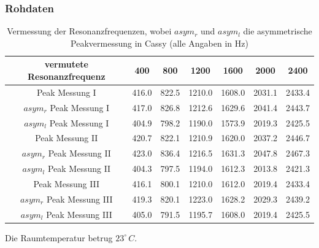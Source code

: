 \documentclass[12pt,a4paper]{article}
\begin{document}
\subsubsection{Rohdaten}
\begin{table}[H]
\begin{tabular}{c|c|c|c|c|c|c}
vermutete Resonanzfrequenz & 400 & 800 & 1200 & 1600 & 2000 & 2400 \\ 
\hline 
Peak Messung I & 416.0 & 822.5 & 1210.0 & 1608.0 & 2031.1 & 2433.4 \\  
$asym_r$ Peak Messung I & 417.0 & 826.8 & 1212.6 & 1629.6 & 2041.4 & 2443.7 \\  
$asym_l$ Peak Messung I & 404.9 & 798.2 & 1190.0 & 1573.9 & 2019.3 & 2425.5 \\ 
\hline 
Peak Messung II & 420.7 & 822.1 & 1210.9 & 1620.0 & 2037.2 & 2446.7 \\  
$asym_r$ Peak Messung II & 423.0 & 836.4 & 1216.5 & 1631.3 & 2047.8 & 2467.3 \\ 
$asym_l$ Peak Messung II & 404.3 & 797.5 & 1194.0 & 1612.3 & 2013.8 & 2421.3 \\ 
\hline 
Peak Messung III & 416.1 & 800.1 & 1210.0 & 1612.0 & 2019.4 & 2433.4 \\  
$asym_r$ Peak Messung III & 419.3 & 820.1 & 1223.0 & 1628.2 & 2029.3 & 2439.2 \\  
$asym_l$ Peak Messung III & 405.0 & 791.5 & 1195.7 & 1608.0 & 2019.4 & 2425.5
\end{tabular}
\caption{Vermessung der Resonanzfrequenzen, wobei $asym_r$ und $asym_l$ die asymmetrische Peakvermessung in Cassy (alle Angaben in Hz)} 
\end{table}
Die Raumtemperatur betrug $23^{\circ}\, C$.
\end{document}
